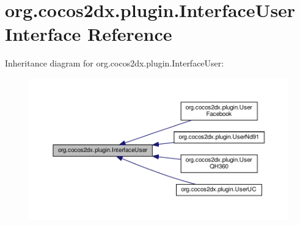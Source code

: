 \hypertarget{interfaceorg_1_1cocos2dx_1_1plugin_1_1InterfaceUser}{}\section{org.\+cocos2dx.\+plugin.\+Interface\+User Interface Reference}
\label{interfaceorg_1_1cocos2dx_1_1plugin_1_1InterfaceUser}


Inheritance diagram for org.\+cocos2dx.\+plugin.\+Interface\+User\+:
\nopagebreak
\begin{figure}[H]
\begin{center}
\leavevmode
\includegraphics[width=350pt]{interfaceorg_1_1cocos2dx_1_1plugin_1_1InterfaceUser__inherit__graph}
\end{center}
\end{figure}
